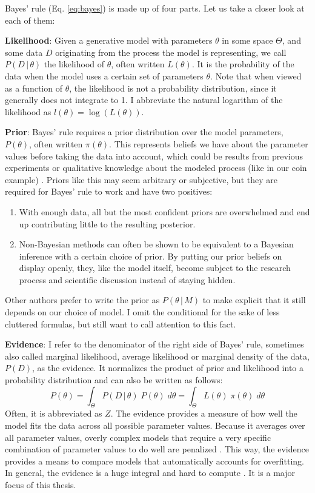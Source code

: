 \documentclass[12pt, a4paper]{report}
\begin{document}
Bayes' rule (Eq. \ref{eq:bayes}) is made up of four parts.
Let us take a closer look at each of them:

\textbf{Likelihood}: Given a generative model with parameters $\theta$ in some space $\Theta$, and some data $D$ originating from the process the model is representing, we call $P(D \,|\, \theta)$ the likelihood of $\theta$, often written $L(\theta)$.
It is the probability of the data when the model uses a certain set of parameters $\theta$.
Note that when viewed as a function of $\theta$, the likelihood is not a probability distribution, since it generally does not integrate to 1.
I abbreviate the natural logarithm of the likelihood as $l(\theta) = \log(L(\theta))$.

\textbf{Prior}: Bayes' rule requires a prior distribution over the model parameters, $P(\theta)$, often written $\pi(\theta)$.
This represents beliefs we have about the parameter values before taking the data into account, which could be results from previous experiments or qualitative knowledge about the modeled process (like in our coin example) \cite[34 f.]{mcelreath}.
Priors like this may seem arbitrary or subjective, but they are required for Bayes' rule to work and have two positives:
\begin{enumerate}
    \item With enough data, all but the most confident priors are overwhelmed and end up contributing little to the resulting posterior.
    \item Non-Bayesian methods can often be shown to be equivalent to a Bayesian inference with a certain choice of prior. \cite[36]{mcelreath} By putting our prior beliefs on display openly, they, like the model itself, become subject to the research process and scientific discussion instead of staying hidden. 
\end{enumerate}
Other authors prefer to write the prior as $P(\theta \, | \, M)$ to make explicit that it still depends on our choice of model.
I omit the conditional for the sake of less cluttered formulas, but still want to call attention to this fact.

\textbf{Evidence}: I refer to the denominator of the right side of Bayes' rule, sometimes also called marginal likelihood, average likelihood or marginal density of the data, $P(D)$, as the evidence.
It normalizes the product of prior and likelihood into a probability distribution and can also be written as follows: 
\begin{equation}
    P(\theta) = \int_\Theta P(D \,|\, \theta) \; P(\theta) \; d\theta = \int_\Theta L(\theta) \; \pi(\theta) \; d\theta
    \label{eq:evidence}
\end{equation}
Often, it is abbreviated as $Z$.
The evidence provides a measure of how well the model fits the data across all possible parameter values.
Because it averages over all parameter values, overly complex models that require a very specific combination of parameter values to do well are penalized \cite[221]{mcelreath}.
This way, the evidence provides a means to compare models that automatically accounts for overfitting. 
In general, the evidence is a huge integral and hard to compute \cite[221]{mcelreath}.
It is a major focus of this thesis.
\end{document}
